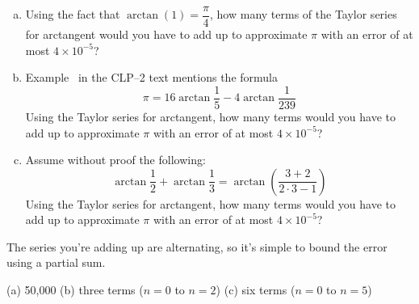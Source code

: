 \begin{Mquestion}
	\begin{enumerate}[(a)]
		\item Using the fact that $\arctan(1)=\dfrac{\pi}{4}$, how many terms of the Taylor series for arctangent would you have to add up to approximate $\pi$ with an error of at most $4\times 10^{-5}$?
		\item Example~ in the CLP--2 text mentions the formula
\[\pi=16\arctan\frac15-4\arctan\frac{1}{239}\]
Using the Taylor series for arctangent, how many terms would you have to add up to approximate $\pi$ with an error of at most $4\times 10^{-5}$?
\item Assume without proof the following:
\[\arctan\frac12+\arctan\frac13=\arctan\left(\frac{3+2}{2\cdot3-1}\right)\]
Using the Taylor series for arctangent, how many terms would you have to add up to approximate $\pi$ with an error of at most $4\times 10^{-5}$?
\end{enumerate}
\end{Mquestion}
\begin{hint}
	The series you're adding up are alternating, so it's simple to bound the error using a partial sum.
\end{hint}
\begin{answer}
	(a) 50,000 \qquad (b) three terms ($n=0$ to $n=2$) \qquad (c)  six terms ($n=0$ to $n=5$)
\end{answer}
